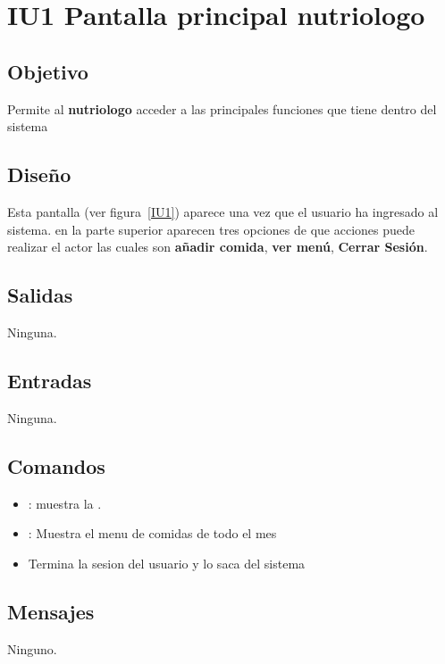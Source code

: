 \section{IU1 Pantalla principal nutriologo}

\subsection{Objetivo}
	Permite al {\bf nutriologo} acceder a las principales funciones que tiene dentro del sistema

\subsection{Diseño}
	Esta pantalla  (ver figura~\ref{IU1}) aparece una vez que el usuario ha ingresado al sistema. 
 en la parte superior aparecen tres opciones de que acciones puede realizar el actor las cuales son {\bf añadir comida}, {\bf ver menú}, {\bf Cerrar Sesión}. 

 

\subsection{Salidas}

	Ninguna.

\subsection{Entradas}

        Ninguna.

\subsection{Comandos}
\begin{itemize}
	\item {}: muestra la .
	\item {}: Muestra el menu de comidas de todo el mes
        \item {}Termina la sesion del usuario y lo saca del sistema
\end{itemize}

\subsection{Mensajes}
Ninguno.

